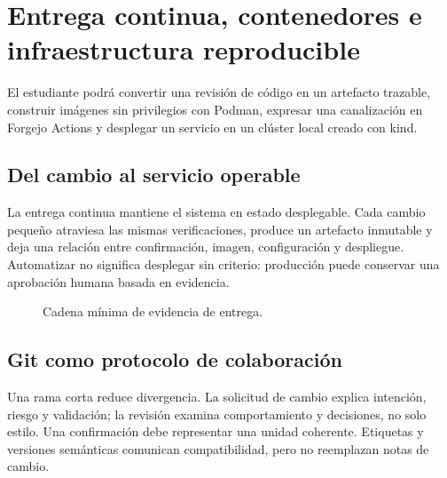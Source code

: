 \chapter{Entrega continua, contenedores e infraestructura reproducible}
\label{chap:entrega}

\begin{objetivos}
El estudiante podrá convertir una revisión de código en un artefacto trazable, construir imágenes sin privilegios con Podman, expresar una canalización en Forgejo Actions y desplegar un servicio en un clúster local creado con kind.
\end{objetivos}

\section{Del cambio al servicio operable}

La entrega continua mantiene el sistema en estado desplegable. Cada cambio pequeño atraviesa las mismas verificaciones, produce un artefacto inmutable y deja una relación entre confirmación, imagen, configuración y despliegue. Automatizar no significa desplegar sin criterio: producción puede conservar una aprobación humana basada en evidencia.

\begin{figure}[htbp]
\centering
{}
\caption{Cadena mínima de evidencia de entrega.}
\end{figure}

\section{Git como protocolo de colaboración}

Una rama corta reduce divergencia. La solicitud de cambio explica intención, riesgo y validación; la revisión examina comportamiento y decisiones, no solo estilo. Una confirmación debe representar una unidad coherente. Etiquetas y versiones semánticas comunican compatibilidad, pero no reemplazan notas de cambio.

